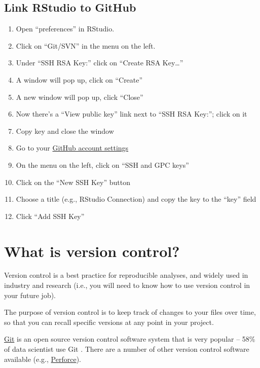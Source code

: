 \documentclass[
]{book}
\begin{document}
\hypertarget{link-rstudio-to-github}{%
\subsection{Link RStudio to GitHub}\label{link-rstudio-to-github}}

\begin{enumerate}
\def\labelenumi{\arabic{enumi}.}
\item
  Open ``preferences'' in RStudio.
\item
  Click on ``Git/SVN'' in the menu on the left.
\item
  Under ``SSH RSA Key:'' click on ``Create RSA Key\ldots{}''
\item
  A window will pop up, click on ``Create''
\item
  A new window will pop up, click ``Close''
\item
  Now there's a ``View public key'' link next to ``SSH RSA Key:''; click on it
\item
  Copy key and close the window
\item
  Go to your \href{https://github.com/settings/profile}{GitHub account settings}
\item
  On the menu on the left, click on ``SSH and GPC keys''
\item
  Click on the ``New SSH Key'' button
\item
  Choose a title (e.g., RStudio Connection) and copy the key to the ``key'' field
\item
  Click ``Add SSH Key''
\end{enumerate}

\hypertarget{what-is-version-control}{%
\section{What is version control?}\label{what-is-version-control}}

Version control is a best practice for reproducible analyses, and widely used in industry and research (i.e., you will need to know how to use version control in your future job).

The purpose of version control is to keep track of changes to your files over time, so that you can recall specific versions at any point in your project.

\href{https://git-scm.com/}{Git} is an open source version control software system that is very popular -- 58\% of data scientist use Git \citep{beckman2020implementing}. There are a number of other version control software available (e.g., \href{https://www.perforce.com/blog/vcs/git-vs-perforce-how-choose-and-when-use-both}{Perforce}).
\end{document}
